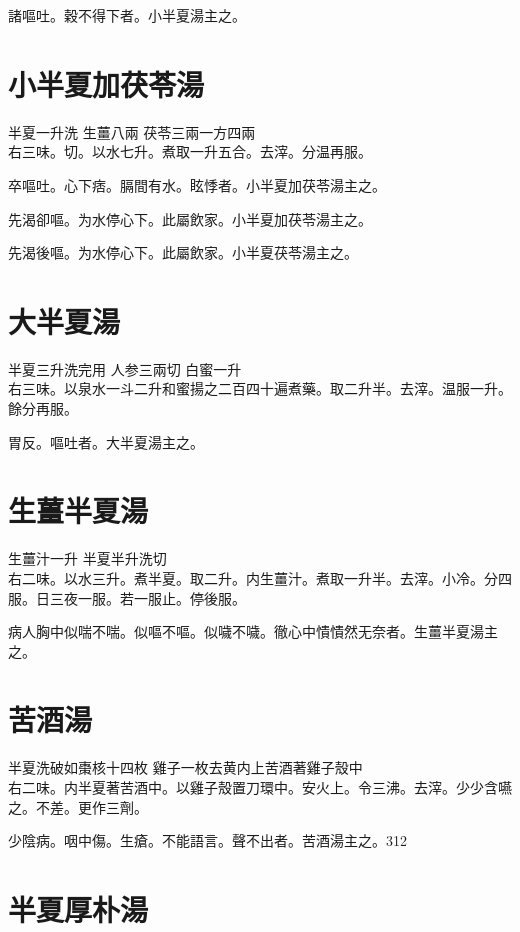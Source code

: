 諸嘔吐。穀不得下者。小半夏湯主之。

\section{小半夏加茯苓湯}

半夏{\scriptsize 一升洗} 生薑{\scriptsize 八兩} 茯苓{\scriptsize 三兩一方四兩}\\
右三味。切。以水七升。煮取一升五合。去滓。分温再服。

卒嘔吐。心下痞。膈間有水。眩悸者。{\khaaitp 小}半夏加茯苓湯主之。

先渴卻嘔。为水停心下。此屬飲家。小半夏加茯苓湯主之。{\wuben}

先渴後嘔。为水停心下。此屬飲家。小半夏茯苓湯主之。{\dengben}

\section{大半夏湯}

半夏{\scriptsize 三升洗完用} 人参{\scriptsize 三兩切} 白蜜{\scriptsize 一升}\\
右三味。以泉水一斗二升和蜜揚之二百四十遍煮藥。取二升半。去滓。温服一升。餘分再服。

胃反。嘔吐者。大半夏湯主之。


\section{生薑半夏湯}

生薑汁{\scriptsize 一升} 半夏{\scriptsize 半升洗切}\\
右二味。以水三升。煮半夏。取二升。内生薑汁。煮取一升半。去滓。小冷。分四服。日三夜一服。若一服止。停後服。

病人胸中似喘不喘。似嘔不嘔。似噦不噦。徹心中憒憒然无奈者。生薑半夏湯主之。

\section{苦酒湯}

半夏{\scriptsize 洗破如棗核十四枚} 雞子{\scriptsize 一枚去黄内上苦酒著雞子殼中}\\
右二味。内半夏著苦酒中。以雞子殼置刀環中。安火上。令三沸。去滓。少少含嚥之。不差。更作三劑。

少陰病。咽中傷。生瘡。不能語言。聲不出者。苦酒湯主之。312

\section{半夏厚朴湯}

